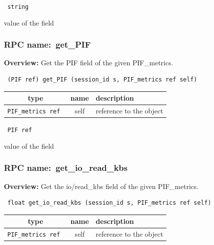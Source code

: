 {\tt 
string
}


value of the field
\vspace{0.3cm}
\vspace{0.3cm}
\vspace{0.3cm}
\subsubsection{RPC name:~get\_PIF}

{\bf Overview:} 
Get the PIF field of the given PIF\_metrics.

\begin{verbatim} (PIF ref) get_PIF (session_id s, PIF_metrics ref self)\end{verbatim}



 
\vspace{0.3cm}
\begin{tabular}{|c|c|p{7cm}|}
 \hline
{\bf type} & {\bf name} & {\bf description} \\ \hline
{\tt PIF\_metrics ref } & self & reference to the object \\ \hline 

\end{tabular}

\vspace{0.3cm}

{\tt 
PIF ref
}


value of the field
\vspace{0.3cm}
\vspace{0.3cm}
\vspace{0.3cm}
\subsubsection{RPC name:~get\_io\_read\_kbs}

{\bf Overview:} 
Get the io/read\_kbs field of the given PIF\_metrics.

\begin{verbatim} float get_io_read_kbs (session_id s, PIF_metrics ref self)\end{verbatim}



 
\vspace{0.3cm}
\begin{tabular}{|c|c|p{7cm}|}
 \hline
{\bf type} & {\bf name} & {\bf description} \\ \hline
{\tt PIF\_metrics ref } & self & reference to the object \\ \hline 

\end{tabular}

